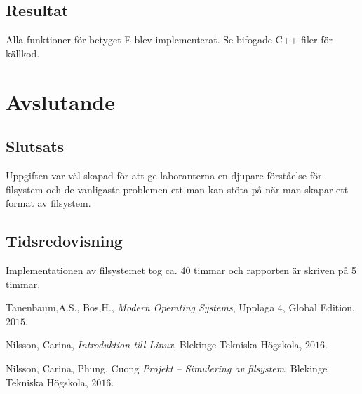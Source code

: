 \documentclass[a4paper,11pt]{article}
\begin{document}
\subsection{Resultat}
Alla funktioner för betyget E blev implementerat. Se bifogade C++ filer för källkod.


\section{Avslutande}
\subsection{Slutsats}
Uppgiften var väl skapad för att ge laboranterna en djupare förståelse för filsystem och de vanligaste problemen ett man kan stöta på när man skapar ett format av filsystem. 

\subsection{Tidsredovisning}
Implementationen av filsystemet tog ca. 40 timmar och rapporten är skriven på 5 timmar.

\begin{thebibliography}{3}

		Tanenbaum,A.S., Bos,H., \textit{Modern Operating Systems}, Upplaga $4$, Global Edition, $2015$.
		
		Nilsson, Carina, \textit{Introduktion till Linux}, Blekinge Tekniska Högskola, $2016$.
		
		Nilsson, Carina, Phung, Cuong \textit{Projekt – Simulering av filsystem}, Blekinge Tekniska Högskola, $2016$.

\end{thebibliography}
\end{document}
